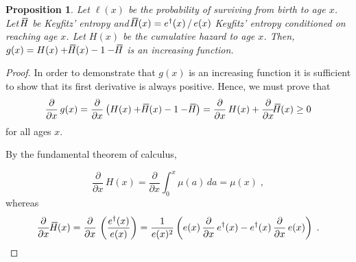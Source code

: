 \documentclass[a4paper,twoside, openright, 12pt, leqno]{article}
\newcommand*\xbar[1]{%
   \hbox{%
     \vbox{%
       \hrule height 0.5pt %
       \kern0.3ex%
       \hbox{%
         \kern-0.25em%
         \ensuremath{#1}%
         \kern-0.05em%
       }%
     }%
   }%
}
\newtheorem{theorem}{Proposition}
\begin{document}
\begin{theorem}
  Let $\ell(x)$ be the probability of surviving from birth to age $x$. Let $\xbar{H}$ be Keyfitz' entropy and $\xbar{H}(x)=e^\dagger(x)\,/\,e(x)$ Keyfitz' entropy conditioned on reaching age $x$. Let $H(x)$ be the cumulative hazard to age $x$. Then, $g(x)=H(x)+\xbar{H}(x)-1-\xbar{H}$ is an increasing function.
 \label{prop2}
\end{theorem}

\begin{proof}
In order to demonstrate that $g(x)$ is an increasing function it is sufficient to show that its first derivative is always positive. Hence, we must prove that
%
\begin{equation}
 \frac{\partial}{\partial x}\,g(x)=\frac{\partial}{\partial x}\left(H(x)+\xbar{H}(x)-1-\xbar{H}\right)=\frac{\partial}{\partial x}\,H(x)+\frac{\partial}{\partial x}\xbar{H}(x)\geq0
 \label{eq:prop2}
\end{equation}
%
for all ages $x$. 

By the fundamental theorem of calculus,

\begin{equation}
  \frac{\partial}{\partial x}\,H(x) = \frac{\partial }{\partial x} \int_0^x\mu(a)\,da =\mu(x)\;,
  \label{Cumhaz.derv}
\end{equation}
%
whereas
%
\begin{equation*}
  \frac{\partial}{\partial x}\,\xbar{H}(x)= \frac{\partial}{\partial x}\,\left(\frac{e^\dagger(x)}{e(x)}\right)= \frac{1}{e(x)^2}\left(e(x)\,\frac{\partial}{\partial x}\,e^\dagger(x)-e^\dagger(x)\,\frac{\partial}{\partial x}\,e(x)\right)\;.
\end{equation*}


\end{proof}
\end{document}

